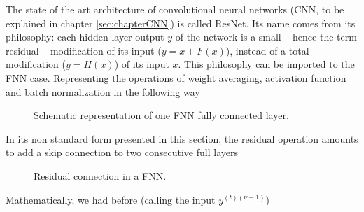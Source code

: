 \begin{subappendices}
The state of the art architecture of convolutional neural networks (CNN, to be explained in chapter \ref{sec:chapterCNN}) is called ResNet\cite{He2015}. Its name comes from its philosophy: each hidden layer output $y$ of the network is a small -- hence the term residual -- modification of its input ($y=x+F(x)$), instead of a total modification ($y=H(x)$) of its input $x$. This philosophy can be imported to the FNN case. Representing the operations of weight averaging, activation function and batch normalization in the following way

\begin{figure}[H]
\begin{center}
\end{center}
\caption{\label{fig:fc_equiv} Schematic representation of one FNN fully connected layer.}
\end{figure}

In its non standard form presented in this section, the residual operation amounts to add a skip connection to two consecutive full layers


\begin{figure}[H]
\begin{center}
\end{center}
\caption{\label{fig:fc_resnet_2} Residual connection in a FNN.}
\end{figure}

Mathematically, we had before (calling the input $y^{(t)(\nu-1)}$)


\end{subappendices}
